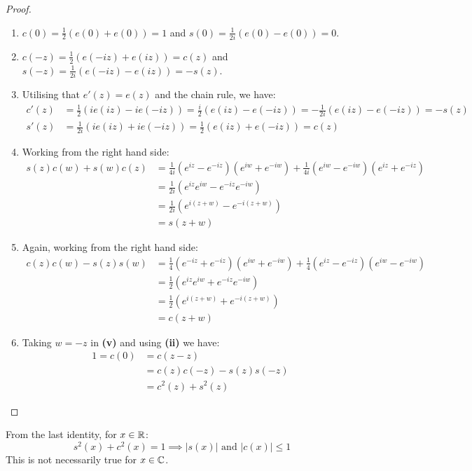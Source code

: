 \documentclass[../main.tex]{subfiles}
\begin{document}
\begin{proof}
  \begin{enumerate}
    \item $c(0) = \frac{1}{2}(e(0) + e(0)) = 1$ and $s(0) = \frac{1}{2i}(e(0) - e(0)) = 0$.
    \item $c(-z) = \frac{1}{2}(e(-iz) + e(iz)) = c(z)$ and $s(-z) = \frac{1}{2i}(e(-iz) - e(iz)) = -s(z)$.
    \item
      Utilising that $e'(z) = e(z)$ and the chain rule, we have:
      \begin{align*}
        c'(z) &= \frac{1}{2}(i e(iz) - i e(-iz)) = \frac{i}{2}(e(iz) - e(-iz)) = - \frac{1}{2i}(e(iz) - e(-iz)) = -s(z) \\
        s'(z) &= \frac{1}{2i}(i e(iz) + ie(-iz)) = \frac{1}{2}(e(iz) + e(-iz)) = c(z)
      \end{align*}
    \item Working from the right hand side:
      \begin{align*}
        s(z)c(w) + s(w)c(z) &= \frac{1}{4i}(e^{iz} - e^{-iz})(e^{iw} + e^{-iw}) + \frac{1}{4i}(e^{iw} - e^{-iw})(e^{iz} + e^{-iz}) \\
                            &= \frac{1}{2i}(e^{iz}e^{iw} - e^{-iz}e^{-iw}) \\
                            &= \frac{1}{2i}(e^{i(z + w)} - e^{-i(z + w)}) \\
                            &= s(z + w)
      \end{align*}
    \item Again, working from the right hand side:
      \begin{align*}
        c(z)c(w) - s(z)s(w) &= \frac{1}{4}(e^{-iz} + e^{-iz})(e^{iw} + e^{-iw}) + \frac{1}{4}(e^{iz} - e^{-iz})(e^{iw} - e^{-iw}) \\
                            &= \frac{1}{2}(e^{iz}e^{iw} + e^{-iz}e^{-iw}) \\
                            &= \frac{1}{2}(e^{i(z + w)} + e^{-i(z + w)}) \\
                            &= c(z + w)
      \end{align*}
    \item Taking $w = -z$ in \textbf{(v)} and using \textbf{(ii)} we have:
      \begin{align*}
        1 = c(0) &= c(z - z) \\
                 &= c(z)c(-z) - s(z)s(-z)  \\
                 &= c^2(z) + s^2(z)
      \end{align*}
  \end{enumerate}
\end{proof}
\begin{remark}
  From the last identity, for $x \in \mathbb{R}$:
  \[
    s^2(x) + c^2(x) = 1 \implies |s(x)| \text{ and } |c(x)| \leq 1
  \]
  This is not necessarily true for $x \in \mathbb{C}$.
\end{remark}
\end{document}
